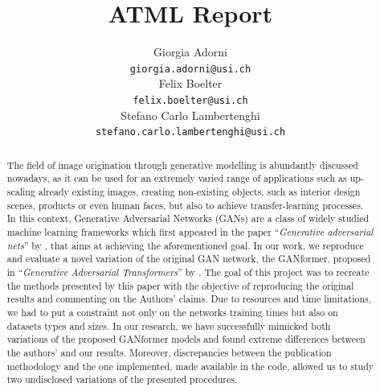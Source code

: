 \documentclass{article}
\title{ATML Report}
\author{%
		Giorgia Adorni \\
		\texttt{giorgia.adorni@usi.ch} \\
		\And
		Felix Boelter\\
		\texttt{felix.boelter@usi.ch}\\
		\And
		Stefano Carlo Lambertenghi\\
		\texttt{stefano.carlo.lambertenghi@usi.ch}\\
}
\begin{document}
	
	\maketitle
	\begin{abstract}
		The field of image origination through generative modelling is abundantly discussed nowadays, as 
		it can be used for an extremely varied range of applications such as up-scaling already existing 
		images, creating non-existing objects, such as interior design scenes, products or even human 
		faces, but also to achieve transfer-learning processes.
		In this context, Generative Adversarial Networks (GANs) are a class of widely studied machine 
		learning frameworks which first appeared in the paper ``\emph{Generative adversarial nets}'' by 
		\citet{goodfellow2014generative}, that aims at achieving the aforementioned goal.
		In our work, we reproduce and evaluate a novel variation of the original GAN network, the 
		GANformer, proposed in ``\emph{Generative Adversarial Transformers}'' by 
		\citet{hudson2021generative}.
		The goal of this project was to recreate the methods presented by this paper with the objective of reproducing the original results and commenting on the Authors' claims.
		Due to resources and time limitations, we had to put a constraint not only on the networks 
		training times but also on datasets types and sizes.
		In our research, we have successfully mimicked both variations of the proposed GANformer 
		models and found extreme differences between the authors' and our results.
		Moreover, discrepancies between the publication methodology and the one implemented, made 
		available in the code, allowed us to study two undisclosed variations of the presented 
		procedures.
	\end{abstract}

	
\end{document}
